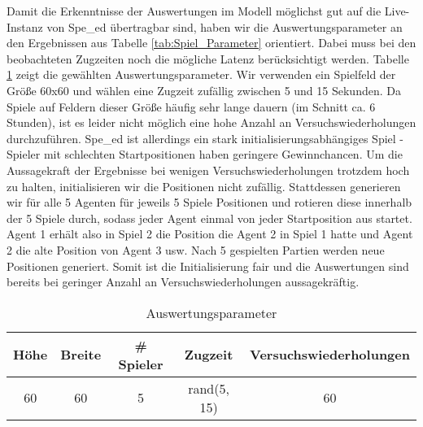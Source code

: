 Damit die Erkenntnisse der Auswertungen im Modell möglichst gut auf die Live-Instanz von Spe\_ed übertragbar sind, haben wir die Auswertungsparameter an den Ergebnissen aus Tabelle \ref{tab:Spiel_Parameter} orientiert. Dabei muss bei den beobachteten Zugzeiten noch die mögliche Latenz berücksichtigt werden. Tabelle \ref{tab:Auswertungsparameter} zeigt die gewählten Auswertungsparameter. Wir verwenden ein Spielfeld der Größe 60x60 und wählen eine Zugzeit zufällig zwischen 5 und 15 Sekunden. Da Spiele auf Feldern dieser Größe häufig sehr lange dauern (im Schnitt ca. 6 Stunden), ist es leider nicht möglich eine hohe Anzahl an Versuchswiederholungen durchzuführen. Spe\_ed ist allerdings ein stark initialisierungsabhängiges Spiel - Spieler mit schlechten Startpositionen haben geringere Gewinnchancen. Um die Aussagekraft der Ergebnisse bei wenigen Versuchswiederholungen trotzdem hoch zu halten, initialisieren wir die Positionen nicht zufällig. Stattdessen generieren wir für alle 5 Agenten für jeweils 5 Spiele Positionen und rotieren diese innerhalb der 5 Spiele durch, sodass jeder Agent einmal von jeder Startposition aus startet. Agent 1 erhält also in Spiel 2 die Position die Agent 2 in Spiel 1 hatte und Agent 2 die alte Position von Agent 3 usw. Nach 5 gespielten Partien werden neue Positionen generiert. Somit ist die Initialisierung fair und die Auswertungen sind bereits bei geringer Anzahl an Versuchswiederholungen aussagekräftig.


\begin{table}[t]
	\begin{tabular}{|c|c|c|c|c|}
		\hline 
		Höhe & Breite & \# Spieler & Zugzeit &  Versuchswiederholungen \\
		\hline\hline
		60 & 60 & 5 & rand(5, 15) & 60 \\
		\hline 
	\end{tabular}
	\centering
	\caption[Auswertungsparameter]{Auswertungsparameter}
	\label{tab:Auswertungsparameter}
\end{table}


